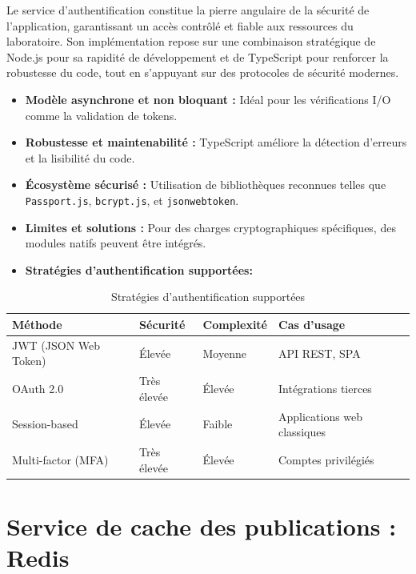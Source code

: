 \documentclass[12pt]{rapportPfe}
\begin{document}
Le service d'authentification constitue la pierre angulaire de la sécurité de l'application, garantissant un accès contrôlé et fiable aux ressources du laboratoire. Son implémentation repose sur une combinaison stratégique de Node.js pour sa rapidité de développement et de TypeScript pour renforcer la robustesse du code, tout en s'appuyant sur des protocoles de sécurité modernes.

\begin{itemize}
    \item \textbf{Modèle asynchrone et non bloquant :} Idéal pour les vérifications I/O comme la validation de tokens.
    \item \textbf{Robustesse et maintenabilité :} TypeScript améliore la détection d’erreurs et la lisibilité du code.
    \item \textbf{Écosystème sécurisé :} Utilisation de bibliothèques reconnues telles que \texttt{Passport.js}, \texttt{bcrypt.js}, et \texttt{jsonwebtoken}.
    \item \textbf{Limites et solutions :} Pour des charges cryptographiques spécifiques, des modules natifs peuvent être intégrés.
    \item \textbf{Stratégies d'authentification supportées:}
\end{itemize}

\begin{table}[ht]
\centering
\begin{tabular}{| >{\raggedright\arraybackslash}p{4cm} 
                | >{\raggedright\arraybackslash}p{3cm} 
                | >{\raggedright\arraybackslash}p{3cm} 
                | >{\raggedright\arraybackslash}p{5cm} |}
\hline
\textbf{Méthode} & \textbf{Sécurité} & \textbf{Complexité} & \textbf{Cas d'usage} \\
\hline
JWT (JSON Web Token) & Élevée & Moyenne & API REST, SPA \\
\hline
OAuth 2.0 & Très élevée & Élevée & Intégrations tierces \\
\hline
Session-based & Élevée & Faible & Applications web classiques \\
\hline
Multi-factor (MFA) & Très élevée & Élevée & Comptes privilégiés \\
\hline
\end{tabular}
\caption{Stratégies d'authentification supportées}
\label{tab:auth-aupported}
\end{table}

\section{Service de cache des publications : Redis}
\end{document}
